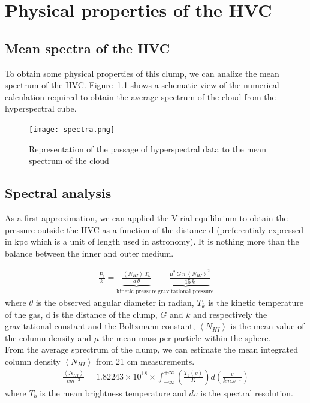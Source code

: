 \documentclass[a4paper,10.5pt]{report}
\begin{document}
\chapter{Physical properties of the HVC}
\section{Mean spectra of the HVC}
To obtain some physical properties of this clump, we can analize the mean spectrum of the HVC.
Figure~\ref{fig::spectra} shows a schematic view of the numerical calculation required to obtain the average spectrum of the cloud
from the hyperspectral cube.

\begin{figure}[h!]
  \centering
  \texttt{[image: spectra.png]}
  \label{fig::spectra}
  \caption{Representation of the passage of hyperspectral data to the mean spectrum of the cloud}
\end{figure}

\section{Spectral analysis}
As a first approximation, we can applied the Virial equilibrium to obtain the pressure outside the HVC as a function
of the distance d (preferentialy expressed in kpc which is a unit of length used in astronomy).
It is nothing more than the balance between the inner and outer medium.

\begin{align}
  \frac{P_s}{k} = \underbrace{\frac{\left< N_{HI} \right> \, T_k}{d \, \theta}}_\text{kinetic pressure} \,
  \underbrace{- \, \frac{\mu^2 \, G \, \pi \, \left< N_{HI} \right>^2}{15 \, k}}_\text{gravitational pressure}
\end{align}
where $\theta$ is the observed angular diameter in radian, $T_k$ is the kinetic temperature of the gas, d is the distance of the clump,
$G$ and $k$ and respectively the gravitational constant and the Boltzmann constant, $\left< N_{HI} \right>$ is the mean value
of the column density and $\mu$ the mean mass per particle within the sphere. \\

\noindent From the average sprectrum of the clump, we can estimate the mean integrated column density
$\left< N_{HI} \right>$ from 21 cm measurements. \\
\begin{align}
  \frac{\left< N_{HI} \right>}{cm^{-2}} = 1.82243 \times 10^{18} \times \int_{-\infty}^{+\infty} \left( \frac{T_b(v)}{K} \right)
  d\left( \frac{v}{km.s^{-1}}\right)
  \label{eq::NHI}
\end{align}
where $T_b$ is the mean brightness temperature and $dv$ is the spectral resolution. \\
\end{document}
